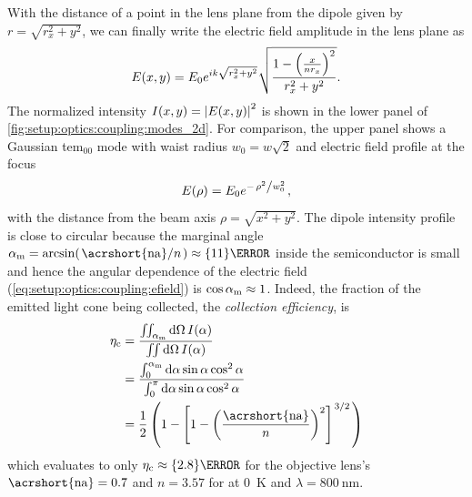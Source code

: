 With the distance of a point in the lens plane from the dipole given by $r = \sqrt{r_{x}^2 + y^2}$, we can finally write the electric field amplitude in the lens plane as
\begin{equation}
    E(x, y) = E_0e^{i k \sqrt{r_{x}^2 + y^2}}\sqrt{\frac{1 - \left(\frac{x}{n r_{x}}\right)^2}{r_{x}^2 + y^2}}.
\end{equation}
The normalized intensity $I(x, y) = \abs{E(x, y)}^2$ is shown in the lower panel of \cref{fig:setup:optics:coupling:modes_2d}.
For comparison, the upper panel shows a Gaussian \acrshort{tem}$_{00}$ mode with waist radius $w_0=w\sqrt{2}$ and electric field profile at the focus~\cite{Yariv1989}
\begin{equation}\label{eq:setup:optics:coupling:tem00}
    E(\rho) = E_0\e^{-\flatfrac{\rho^2}{w_0^{2}}},
\end{equation}
with the distance from the beam axis $\rho = \sqrt{x^2 + y^2}$.
The dipole intensity profile is close to circular because the marginal angle $\alpha_\mr{m}=\arcsin(\flatfrac{\mr{\acrshort{na}}}{n})\approx\qty{11}{\degree}$ inside the semiconductor is small and hence the angular dependence of the electric field (\cf \cref{eq:setup:optics:coupling:efield}) is $\cos\alpha_{\mathrm{m}}\approx 1$.
Indeed, the fraction of the emitted light cone being collected, the \emph{collection efficiency}, is
\begin{equation}\label{eq:setup:optics:coupling:efficiency:collection}
    \begin{split}
        \eta_{\mr{c}} &= \frac{\iint_{\alpha_{\mr{m}}}\dd{\Omega} I(\alpha)}{\iint\dd{\Omega} I(\alpha)} \\
                      &= \frac{\int_{0}^{\alpha_{\mr{m}}}\dd{\alpha}\sin\alpha\cos^2\alpha}{\int_{0}^{\pi}\dd{\alpha}\sin\alpha\cos^2\alpha} \\
                      &= \frac{1}{2}\left(1 - \left[1 - \left(\frac{\mr{\acrshort{na}}}{n}\right)^2\right]^{\flatfrac{3}{2}}\right)
    \end{split}
\end{equation}
which evaluates to only $\eta_{\mr{c}}\approx\qty{2.8}{\percent}$ for the objective lens's $\mr{\acrshort{na}}=\num{0.7}$ and $n=\num{3.57}$ for  at \qty{0}{\kelvin} and $\lambda=\qty{800}{\nano\meter}$.

